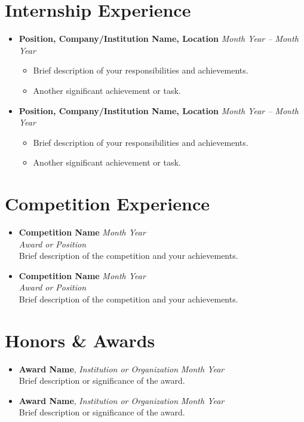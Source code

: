 \documentclass[a4paper,10pt]{article}
\begin{document}
\section*{Internship Experience}
\begin{itemize}[leftmargin=0.5cm]
    \item \textbf{Position, Company/Institution Name, Location} \hfill \textit{Month Year -- Month Year} 
    
    \begin{itemize}
        \item Brief description of your responsibilities and achievements.
        \item Another significant achievement or task.
    \end{itemize}
    
    \item \textbf{Position, Company/Institution Name, Location} \hfill \textit{Month Year -- Month Year}
    
    \begin{itemize}
        \item Brief description of your responsibilities and achievements.
        \item Another significant achievement or task.
    \end{itemize}
\end{itemize}

\section*{Competition Experience}
\begin{itemize}[leftmargin=0.5cm]
    \item \textbf{Competition Name} \hfill \textit{Month Year} \\
    \textit{Award or Position} \\
    Brief description of the competition and your achievements.
    
    \item \textbf{Competition Name} \hfill \textit{Month Year} \\
    \textit{Award or Position} \\
    Brief description of the competition and your achievements.
\end{itemize}

\section*{Honors \& Awards}
\begin{itemize}[leftmargin=0.5cm]
    \item \textbf{Award Name}, \textit{Institution or Organization} \hfill \textit{Month Year} \\
    Brief description or significance of the award.
    
    \item \textbf{Award Name}, \textit{Institution or Organization} \hfill \textit{Month Year} \\
    Brief description or significance of the award.
\end{itemize}
\end{document}
